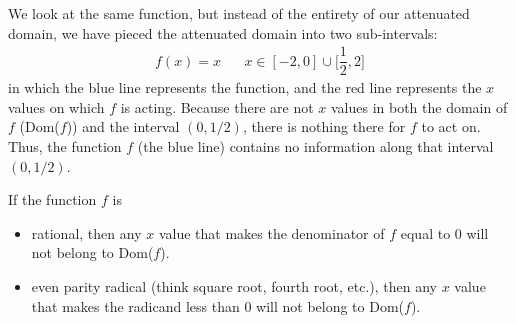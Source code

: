 \begin{example}
We look at the same function, but instead of the entirety of our attenuated domain, we have pieced the attenuated domain into two sub-intervals:
\begin{align*}
    f(x) = x \hspace{20pt} x \in [-2, 0] \cup \Big[\dfrac{1}{2}, 2\Big]
\end{align*}
in which the blue line represents the function, and the red line represents the $x$ values on which $f$ is acting. Because there are not $x$ values in both the domain of $f$ (Dom($f$)) and the interval $(0, 1/2)$, there is nothing there for $f$ to act on. Thus, the function $f$ (the blue line) contains no information along that interval $(0, 1/2)$.

\vspace{0.5in}
\end{example}

\begin{recall}
If the function $f$ is
\begin{itemize}
    \item rational, then any $x$ value that makes the denominator of $f$ equal to $0$ will not belong to Dom($f$).\\
    \item even parity radical (think square root, fourth root, etc.), then any $x$ value that makes the radicand less than $0$ will not belong to Dom($f$).
\end{itemize}
\end{recall}